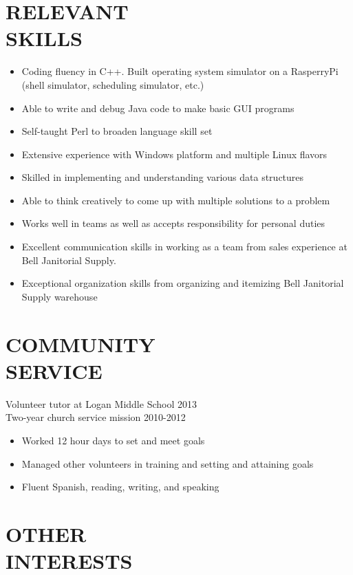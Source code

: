 \documentclass[line,margin]{res}
\begin{document}
\begin{resume}
\section{RELEVANT\\SKILLS} 
		\begin{itemize}
			\item Coding fluency in C++. Built operating system simulator on 
				a RasperryPi (shell simulator, scheduling simulator, etc.)
			\item Able to write and debug Java code to make basic GUI programs
			\item Self-taught Perl to broaden language skill set 
			\item Extensive experience with Windows platform and multiple Linux flavors
			\item Skilled in implementing and understanding various data structures
			\item Able to think creatively to come up with multiple solutions to a problem
			\item Works well in teams as well as accepts responsibility for personal duties
			\item Excellent communication skills in working as a team from sales experience
				at Bell Janitorial Supply.
			\item Exceptional organization skills from organizing and itemizing Bell 								Janitorial Supply warehouse
		\end{itemize}
 
\section{COMMUNITY \\ SERVICE}  
		
		Volunteer tutor at Logan Middle School \hfill 2013
		\\Two-year church service mission \hfill 2010-2012
		\begin{itemize} \itemsep -2pt %
		\item Worked 12 hour days to set and meet goals
		\item Managed other volunteers in training and setting and attaining goals 
		\item Fluent Spanish, reading, writing, and speaking
		\end{itemize}

\section{OTHER \\ INTERESTS} 
		

\end{resume}
\end{document}

